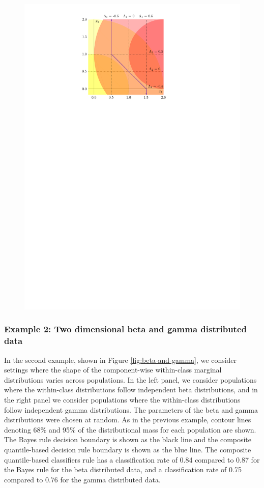 \begin{figure}[ht]
\begin{minipage}[t]{0.44\linewidth}
    \includegraphics[width=1\textwidth]{gauss_quant_rule}
  \end{minipage}
\end{figure}




\subsubsection*{Example 2:  Two dimensional beta and gamma distributed data}
\label{sec:beta-gamma-example}

In the second example, shown in Figure \ref{fig:beta-and-gamma}, we consider
settings where the shape of the component-wise within-class marginal
distributions varies across populations.  In the left panel, we consider
populations where the within-class distributions follow independent beta
distributions, and in the right panel we consider populations where the
within-class distributions follow independent gamma distributions.  The
parameters of the beta and gamma distributions were chosen at random.  As in the
previous example, contour lines denoting 68\% and 95\% of the distributional
mass for each population are shown.  The Bayes rule decision boundary is shown
as the black line and the composite quantile-based decision rule boundary is
shown as the blue line.  The composite quantile-based classifiers rule has a
classification rate of 0.84 compared to 0.87 for the Bayes rule for the beta
distributed data, and a classification rate of 0.75 compared to 0.76 for the
gamma distributed data.

